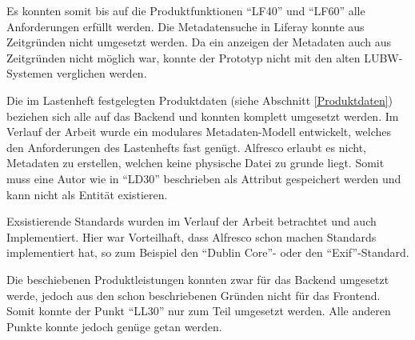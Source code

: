 Es konnten somit bis auf die Produktfunktionen "`LF40"' und "`LF60"' alle Anforderungen erf\"ullt werden. Die Metadatensuche in Liferay konnte aus Zeitgr\"unden nicht umgesetzt werden. Da ein anzeigen der Metadaten auch aus Zeitgr\"unden nicht m\"oglich war, konnte der Prototyp nicht mit den alten \ac{LUBW}-Systemen verglichen werden.

Die im Lastenheft festgelegten Produktdaten (siehe Abschnitt \ref{Produktdaten}) beziehen sich alle auf das Backend und konnten komplett umgesetzt werden. Im Verlauf der Arbeit wurde ein modulares Metadaten-Modell entwickelt, welches den Anforderungen des Lastenhefts fast gen\"ugt. Alfresco erlaubt es nicht, Metadaten zu erstellen, welchen keine physische Datei zu grunde liegt. Somit muss eine Autor wie in "`LD30"' beschrieben als Attribut gespeichert werden und kann nicht als Entit\"at existieren.

Exsistierende Standards wurden im Verlauf der Arbeit betrachtet und auch Implementiert. Hier war Vorteilhaft, dass Alfresco schon machen Standards implementiert hat, so zum Beispiel den "`Dublin Core"'- oder den "`\ac{Exif}"'-Standard.

Die beschiebenen Produktleistungen konnten zwar f\"ur das Backend umgesetzt werde, jedoch aus den schon beschriebenen Gr\"unden nicht f\"ur das Frontend. Somit konnte der Punkt "`LL30"' nur zum Teil umgesetzt werden. Alle anderen Punkte konnte jedoch gen\"uge getan werden.


